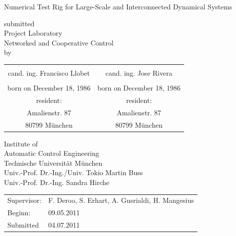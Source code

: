 \documentclass[a4paper,twoside, openright,12pt]{report}
\begin{document}
\pagestyle{empty}
\enlargethispage{4.5cm} %
\begin{center}
\phantom{u}
\vspace{0.5cm}
\Huge{\sc Numerical Test Rig for Large-Scale and Interconnected Dynamical
Systems}\\
\vspace{1.5cm}
                                 \large{submitted\\
				  Project Laboratory\\
				  Networked and Cooperative Control\\
					   by         

						
					\begin{tabular}{c c}
					    \vspace{0.4cm} & \vspace{0.4cm} \\
					 cand. ing. Francisco Llobet& cand. ing. Jose Rivera  \\
						\vspace{0.5cm} & \vspace{0.5cm}\\
					born on December 18, 1986 & born on December 18, 1986\\
					resident: & resident:\\
					Amalienstr. 87& Amalienstr. 87\\
					80799 M\"{u}nchen & 80799 M\"{u}nchen  
					\end{tabular}

					                           
					\vspace{1.5cm}
					Institute of\\
					Automatic Control Engineering\\
					Technische Universit\"{a}t M\"{u}nchen\\
					\vspace{0.3cm}
					Univ.-Prof. Dr.-Ing./Univ. Tokio Martin Buss\\
                                        Univ.-Prof. Dr.-Ing. Sandra Hirche}
\end{center}
\vspace{2.5cm}
\begin{tabular}{ll}
Supervisor: & F. Deroo, S. Erhart, A. Gusrialdi, H. Mangesius  \\
Beginn: & 09.05.2011  \\
Submitted &  04.07.2011 \\
\end{tabular}
\end{document}
